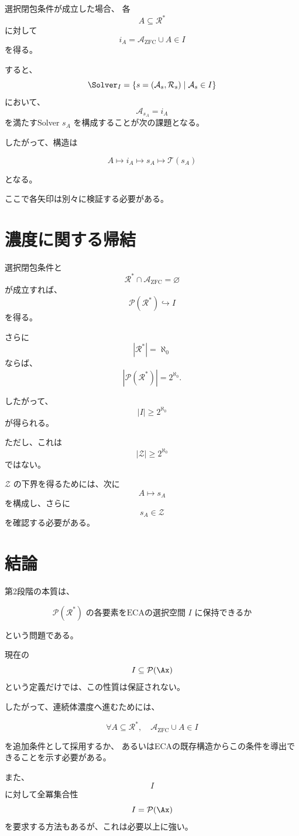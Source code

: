 \documentclass[11pt,a4paper]{article}
\begin{document}
選択閉包条件が成立した場合、
各
\[
A\subseteq\mathcal{R}^*
\]
に対して
\[
i_A
=
\mathcal{A}_{\mathrm{ZFC}}\cup A
\in I
\]
を得る。

すると、
\[
\Solver_I
=
\{s=(\mathcal{A}_s,\mathcal{R}_s)\mid\mathcal{A}_s\in I\}
\]
において、
\[
\mathcal{A}_{s_A}=i_A
\]
を満たすSolver $s_A$ を構成することが次の課題となる。

したがって、構造は

\[
A
\longmapsto
i_A
\longmapsto
s_A
\longmapsto
\mathcal{T}(s_A)
\]

となる。

ここで各矢印は別々に検証する必要がある。

\section{濃度に関する帰結}

選択閉包条件と
\[
\mathcal{R}^*\cap\mathcal{A}_{\mathrm{ZFC}}=\varnothing
\]
が成立すれば、
\[
\mathcal{P}(\mathcal{R}^*)\hookrightarrow I
\]
を得る。

さらに
\[
|\mathcal{R}^*|=\aleph_0
\]
ならば、
\[
|\mathcal{P}(\mathcal{R}^*)|
=
2^{\aleph_0}.
\]

したがって、
\[
\boxed{
|I|\geq2^{\aleph_0}
}
\]
が得られる。

ただし、これは
\[
|\mathcal{Z}|\geq2^{\aleph_0}
\]
ではない。

$\mathcal{Z}$ の下界を得るためには、次に
\[
A\longmapsto s_A
\]
を構成し、さらに
\[
s_A\in\mathcal{Z}
\]
を確認する必要がある。

\section{結論}

第2段階の本質は、

\[
\boxed{
\mathcal{P}(\mathcal{R}^*)
\text{ の各要素をECAの選択空間 }I\text{ に保持できるか}
}
\]

という問題である。

現在の
\[
I\subseteq\mathcal{P}(\Ax)
\]
という定義だけでは、この性質は保証されない。

したがって、連続体濃度へ進むためには、

\[
\boxed{
\forall A\subseteq\mathcal{R}^*,
\quad
\mathcal{A}_{\mathrm{ZFC}}\cup A\in I
}
\]

を追加条件として採用するか、
あるいはECAの既存構造からこの条件を導出できることを示す必要がある。

また、
\[
I
\]
に対して全冪集合性
\[
I=\mathcal{P}(\Ax)
\]
を要求する方法もあるが、これは必要以上に強い。
\end{document}
